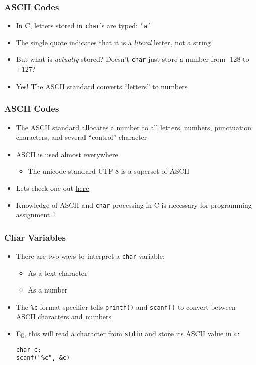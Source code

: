 \documentclass[14pt]{beamer}
\begin{document}
\begin{frame}
\frametitle{ASCII Codes}
\begin{itemize}
\item In C, letters stored in \texttt{char}'s are typed: \texttt{'a'}
\item The single quote indicates that it is a \textit{literal} letter, not a string
\pause
\item But what is \textit{actually} stored? Doesn't \texttt{char} just store a number from -128 to +127?
\pause
\item Yes! The ASCII standard converts ``letters'' to numbers
\end{itemize}
\end{frame}

\begin{frame}
\frametitle{ASCII Codes}
\begin{itemize}
\item The ASCII standard allocates a number to all letters, numbers, punctuation characters, and several ``control'' character
\item ASCII is used almost everywhere
	\begin{itemize}
		\item The unicode standard UTF-8 is a superset of ASCII
	\end{itemize}
\item Lets check one out \underline{\href{http://asciichart.com/}{here}}
\item Knowledge of ASCII and \texttt{char} processing in C is necessary for programming assignment 1
\end{itemize}
\end{frame}

\begin{frame}[fragile]
\frametitle{Char Variables}
\begin{itemize}
\item There are two ways to interpret a \texttt{char} variable:
	\begin{itemize}
		\item As a text character
		\item As a number
	\end{itemize}
\item The \texttt{\%c} format specifier tells \texttt{printf()} and \texttt{scanf()} to convert between ASCII characters and numbers
\item Eg, this will read a character from \texttt{stdin} and store its ASCII value in \texttt{c}:
\begin{lstlisting}[style=CStyle]
char c;
scanf("%c", &c)
\end{lstlisting}
\end{itemize}
\end{frame}
\end{document}

